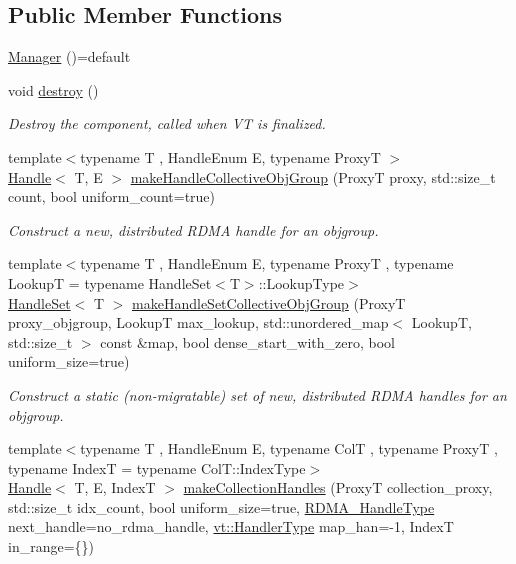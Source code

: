 \subsection*{Public Member Functions}
\begin{DoxyCompactItemize}
\item 
\hyperlink{structvt_1_1rdma_1_1_manager_a8c9850c80d45b15a6b2ca918ef77c0a0}{Manager} ()=default
\item 
void \hyperlink{structvt_1_1rdma_1_1_manager_a16d6d19d7a0eb1dfac611702832617a7}{destroy} ()
\begin{DoxyCompactList}\small\item\em Destroy the component, called when VT is finalized. \end{DoxyCompactList}\item 
{\footnotesize template$<$typename T , Handle\+Enum E, typename ProxyT $>$ }\\\hyperlink{structvt_1_1rdma_1_1_handle}{Handle}$<$ T, E $>$ \hyperlink{structvt_1_1rdma_1_1_manager_a1aea03b0c098e22cedc08159a64dbd7c}{make\+Handle\+Collective\+Obj\+Group} (ProxyT proxy, std\+::size\+\_\+t count, bool uniform\+\_\+count=true)
\begin{DoxyCompactList}\small\item\em Construct a new, distributed R\+D\+MA handle for an objgroup. \end{DoxyCompactList}\item 
{\footnotesize template$<$typename T , Handle\+Enum E, typename ProxyT , typename LookupT  = typename Handle\+Set$<$\+T$>$\+::\+Lookup\+Type$>$ }\\\hyperlink{structvt_1_1rdma_1_1_handle_set}{Handle\+Set}$<$ T $>$ \hyperlink{structvt_1_1rdma_1_1_manager_aa86a5f0d86cd0e721f863a68fbe66a35}{make\+Handle\+Set\+Collective\+Obj\+Group} (ProxyT proxy\+\_\+objgroup, LookupT max\+\_\+lookup, std\+::unordered\+\_\+map$<$ LookupT, std\+::size\+\_\+t $>$ const \&map, bool dense\+\_\+start\+\_\+with\+\_\+zero, bool uniform\+\_\+size=true)
\begin{DoxyCompactList}\small\item\em Construct a static (non-\/migratable) set of new, distributed R\+D\+MA handles for an objgroup. \end{DoxyCompactList}\item 
{\footnotesize template$<$typename T , Handle\+Enum E, typename ColT , typename ProxyT , typename IndexT  = typename Col\+T\+::\+Index\+Type$>$ }\\\hyperlink{structvt_1_1rdma_1_1_handle}{Handle}$<$ T, E, IndexT $>$ \hyperlink{structvt_1_1rdma_1_1_manager_aad62be5c2cb0225139cf3d665b5fd7f2}{make\+Collection\+Handles} (ProxyT collection\+\_\+proxy, std\+::size\+\_\+t idx\+\_\+count, bool uniform\+\_\+size=true, \hyperlink{namespacevt_a10442579ec4e7ebef223818e64bcf908}{R\+D\+M\+A\+\_\+\+Handle\+Type} next\+\_\+handle=no\+\_\+rdma\+\_\+handle, \hyperlink{namespacevt_af64846b57dfcaf104da3ef6967917573}{vt\+::\+Handler\+Type} map\+\_\+han=-\/1, IndexT in\+\_\+range=\{\})

\end{DoxyCompactItemize}
